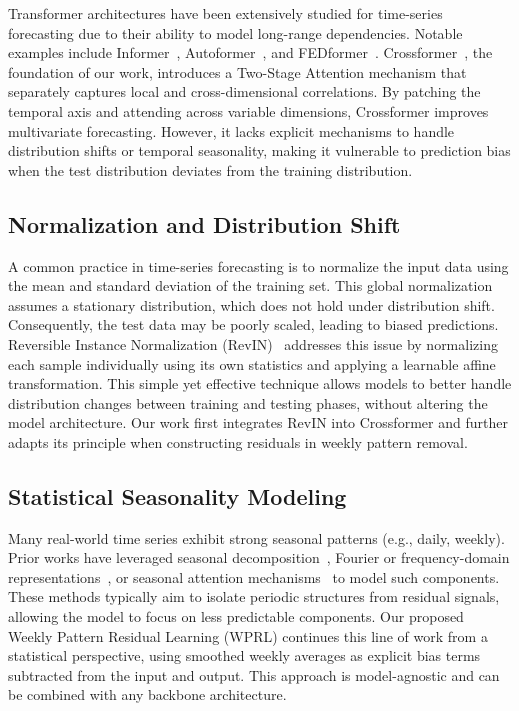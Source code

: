 \documentclass{article}
\begin{document}
Transformer architectures have been extensively studied for time-series forecasting due to their ability to model long-range dependencies. Notable examples include Informer~\cite{zhou2021informer}, Autoformer~\cite{wu2021autoformer}, and FEDformer~\cite{zhou2022fedformer}. Crossformer~\cite{crossformer2023}, the foundation of our work, introduces a Two-Stage Attention mechanism that separately captures local and cross-dimensional correlations. By patching the temporal axis and attending across variable dimensions, Crossformer improves multivariate forecasting. However, it lacks explicit mechanisms to handle distribution shifts or temporal seasonality, making it vulnerable to prediction bias when the test distribution deviates from the training distribution.

\subsection{Normalization and Distribution Shift}

A common practice in time-series forecasting is to normalize the input data using the mean and standard deviation of the training set. This global normalization assumes a stationary distribution, which does not hold under distribution shift. Consequently, the test data may be poorly scaled, leading to biased predictions. Reversible Instance Normalization (RevIN)~\cite{kim2022reversible} addresses this issue by normalizing each sample individually using its own statistics and applying a learnable affine transformation. This simple yet effective technique allows models to better handle distribution changes between training and testing phases, without altering the model architecture. Our work first integrates RevIN into Crossformer and further adapts its principle when constructing residuals in weekly pattern removal.

\subsection{Statistical Seasonality Modeling}

Many real-world time series exhibit strong seasonal patterns (e.g., daily, weekly). Prior works have leveraged seasonal decomposition~\cite{cleveland1990stl}, Fourier or frequency-domain representations~\cite{wu2021autoformer}, or seasonal attention mechanisms~\cite{zhou2022fedformer} to model such components. These methods typically aim to isolate periodic structures from residual signals, allowing the model to focus on less predictable components. Our proposed Weekly Pattern Residual Learning (WPRL) continues this line of work from a statistical perspective, using smoothed weekly averages as explicit bias terms subtracted from the input and output. This approach is model-agnostic and can be combined with any backbone architecture.
\end{document}
